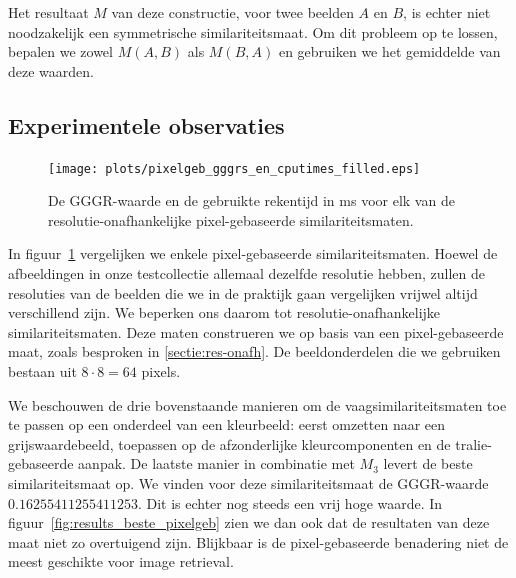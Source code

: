 Het resultaat $M$ van deze constructie, voor twee beelden $A$ en $B$, is echter niet noodzakelijk 
een symmetrische similariteitsmaat. Om dit probleem op te lossen, bepalen we zowel $M(A,B)$ als
$M(B,A)$ en gebruiken we het gemiddelde van deze waarden.


\subsection{Experimentele observaties}

\begin{figure}[tbp]
\begin{center}
\texttt{[image: plots/pixelgeb\_gggrs\_en\_cputimes\_filled.eps]}
\caption{\label{fig:pixelgeb_gggrs_en_cputimes}De GGGR-waarde en de gebruikte rekentijd in ms voor elk van de resolutie-onafhankelijke pixel-gebaseerde similariteitsmaten.}
\end{center}
\end{figure}

In figuur~\ref{fig:pixelgeb_gggrs_en_cputimes} vergelijken we enkele pixel-gebaseerde similariteitsmaten.
Hoewel de afbeeldingen in onze testcollectie allemaal dezelfde resolutie hebben, zullen de
resoluties van de beelden die we in de praktijk gaan vergelijken vrijwel altijd verschillend zijn.
We beperken ons daarom tot resolutie-onafhankelijke similariteitsmaten. Deze maten construeren
we op basis van een pixel-gebaseerde maat, zoals besproken in \ref{sectie:res-onafh}. De 
beeldonderdelen die we gebruiken bestaan uit $8 \cdot 8 = 64$ pixels.

We beschouwen de drie bovenstaande manieren om de vaagsimilariteitsmaten toe te passen op een 
onderdeel van een kleurbeeld:
eerst omzetten naar een grijswaardebeeld, 
toepassen op de afzonderlijke kleurcomponenten en 
de tralie-gebaseerde aanpak.
De laatste manier in combinatie met $M_{3}$ levert de beste similariteitsmaat op. We vinden
voor deze similariteitsmaat de GGGR-waarde $0.16255411255411253$. Dit is echter nog steeds een
vrij hoge waarde. In figuur~\ref{fig:results_beste_pixelgeb}
zien we dan ook dat de resultaten van deze maat niet zo overtuigend zijn. Blijkbaar 
is de pixel-gebaseerde benadering niet de meest geschikte voor image retrieval. 

